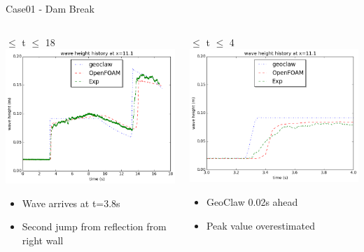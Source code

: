 \documentclass[xcolor=dvipsnames]{beamer}
\begin{document}
\begin{frame}[label=sec-5-2]{Case01 - Dam Break}
\begin{columns}
\begin{column}{0.5\textwidth}
\begin{block}{\qquad{} $\le$ t $\le$ 18}
\includegraphics[width=.9\linewidth]{../paper/plots/waveheight_nocolumn.png} \\
\begin{itemize}
\item Wave arrives at t=3.8s
\item Second jump from reflection from right wall
\end{itemize}
\end{block}
\end{column}

\begin{column}{0.6\textwidth}
\begin{block}{\qquad{} $\le$ t $\le$ 4}
\includegraphics[width=.9\linewidth]{../paper/plots/waveheight_nocolumn_zoomin.png}  \\
\begin{itemize}
\item GeoClaw 0.02s ahead
\item Peak value overestimated
\end{itemize}
\vskip5mm
\end{block}
\end{column}
\end{columns}


\end{frame}
\end{document}

